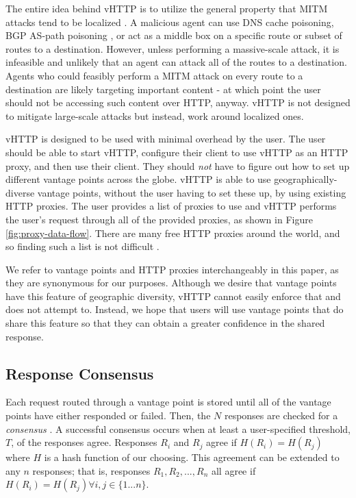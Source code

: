 The entire idea behind vHTTP is to utilize the general property that MITM
attacks tend to be localized \cite{MITM-Survey}. A malicious agent can use DNS
cache poisoning, BGP AS-path poisoning \cite{Hotpets17}, or act as a middle
box on a specific route or subset of routes to a destination. However, unless
performing a massive-scale attack, it is infeasible and unlikely that an agent
can attack all of the routes to a destination. Agents who could feasibly
perform a MITM attack on every route to a destination are likely targeting
important content - at which point the user should not be accessing such
content over HTTP, anyway. vHTTP is not designed to mitigate large-scale
attacks but instead, work around localized ones.

vHTTP is designed to be used with minimal overhead by the user. The user should
be able to start vHTTP, configure their client to use vHTTP as an HTTP proxy,
and then use their client. They should \emph{not} have to figure out how to set
up different vantage points across the globe. vHTTP is able to use
geographically-diverse vantage points, without the user having to set these up,
by using existing HTTP proxies. The user provides a list of proxies to use and
vHTTP performs the user's request through all of the provided proxies, as shown
in Figure \ref{fig:proxy-data-flow}. There are many free HTTP proxies around
the world, and so finding such a list is not difficult
\cite{HideMyName-Proxies, NordVPN-Proxies, FreeProxyList}.

We refer to vantage points and HTTP proxies interchangeably in this paper, as
they are synonymous for our purposes. Although we desire that vantage points
have this feature of geographic diversity, vHTTP cannot easily enforce that
and does not attempt to. Instead, we hope that users will use vantage points
that do share this feature so that they can obtain a greater confidence in the
shared response.



\subsection{Response Consensus}

Each request routed through a vantage point is stored until all of the
vantage points have either responded or failed. Then, the $N$ responses are
checked for a \textit{consensus} \cite{Perspectives}. A successful consensus
occurs when at least a user-specified threshold, $T$, of the responses agree.
Responses $R_i$ and $R_j$ agree if $H(R_i) = H(R_j)$ where $H$ is a hash
function of our choosing. This agreement can be extended to any $n$ responses;
that is, responses $R_1, R_2, ..., R_n$ all agree if
$H(R_i) = H(R_j) \forall i, j \in \{1...n\}$.

